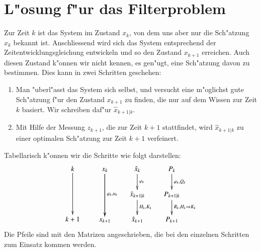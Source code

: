 \section{L"osung f"ur das Filterproblem}
Zur Zeit $k$ ist das System im Zustand $x_k$, von dem uns aber nur die
Sch"atzung $\hat x_k$ bekannt ist. Anschliessend wird sich
das System entsprechend der Zeitentwicklungsgleichung entwickeln und
so den Zustand $x_{k+1}$ erreichen. Auch diesen Zustand k"onnen wir nicht
kennen, es gen"ugt, eine Sch"atzung davon zu bestimmen. Dies kann in zwei
Schritten geschehen:
\begin{enumerate}
\item Man "uberl"asst das System sich selbst, und versucht eine m"oglichst
gute Sch"atzung f"ur den Zustand $x_{k+1}$ zu finden, die nur auf dem
Wissen zur Zeit $k$ basiert. Wir schreiben daf"ur $\hat x_{k+1|k}$.
\item Mit Hilfe der Messung $z_{k+1}$, die zur Zeit $k+1$ stattfindet, wird
$\hat x_{k+1|k}$ zu einer optimalen Sch"atzung zur Zeit $k+1$ verfeinert.
\end{enumerate}
Tabellarisch k"onnen wir die Schritte wie folgt darstellen:
\[
\xymatrix @-1mm {
k\ar[dd]&x_k\ar[dd]\ar[dd]^{\varphi_k, u_k} &\hat x_k\ar[d]^{\varphi_k}      &P_{k} \ar[d]^{\varphi_k,Q_k}    \\
        &           &\hat x_{k+1|k}\ar[d]^{H_k,K_k}&P_{k+1|k}\ar[d]^{R_k,H_k\Rightarrow K_k} \\
k+1     &x_{k+1}    &\hat x_{k+1}  &P_{k+1}
} \]
Die Pfeile sind mit den Matrizen angeschrieben, die bei den einzelnen Schritten zum
Einsatz kommen werden.

